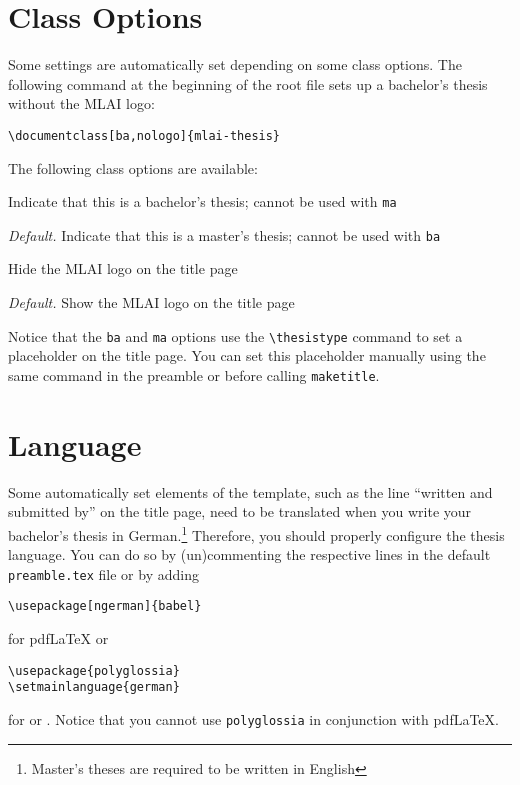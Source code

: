 \section{Class Options} \label{sec:class-options}

Some settings are automatically set depending on some class options. The following command at the beginning of the root file sets up a bachelor's thesis without the MLAI logo:  
\begin{Verbatim}
\documentclass[ba,nologo]{mlai-thesis} 
\end{Verbatim}

The following class options are available: 
\begin{description}[font=\normalfont\ttfamily]
	\item[ba] Indicate that this is a bachelor's thesis; cannot be used with \texttt{ma} 
	\item[ma] \emph{Default.} Indicate that this is a master's thesis; cannot be used with \texttt{ba} 
	\item[nologo] Hide the MLAI logo on the title page
	\item[logo] \emph{Default.} Show the MLAI logo on the title page
\end{description}
Notice that the \texttt{ba} and \texttt{ma} options use the \verb|\thesistype| command to set a placeholder on the title page. You can set this placeholder manually using the same command in the preamble or before calling \texttt{maketitle}. 

\section{Language} \label{sec:language} 

Some automatically set elements of the template, such as the line \enquote{written and submitted by} on the title page, need to be translated when you write your bachelor's thesis in German.\footnote{Master's theses are required to be written in English} Therefore, you should properly configure the thesis language. You can do so by (un)commenting the respective lines in the default \texttt{preamble.tex} file or by adding 
\begin{Verbatim}
\usepackage[ngerman]{babel}
\end{Verbatim} 
for pdf\LaTeX{} or 
\begin{Verbatim}
\usepackage{polyglossia}
\setmainlanguage{german} 
\end{Verbatim}
for \LuaLaTeX{} or \XeLaTeX{}. Notice that you cannot use \texttt{polyglossia} in conjunction with pdf\LaTeX{}. 

